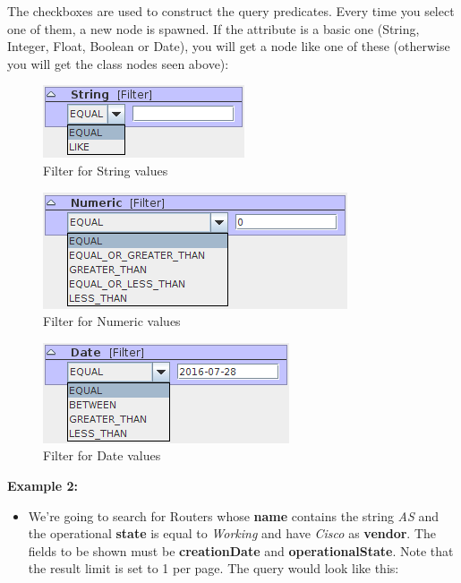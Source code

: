 \documentclass[a4paper]{article}
\begin{document}
	The checkboxes are used to construct the query predicates. Every time you select one of them, a new node is spawned. If the attribute is a basic one (String, Integer, Float, Boolean or Date), you will get a node like one of these (otherwise you will get the class nodes seen above):
	\begin{figure}[h!]
		\centering
		\includegraphics[width=0.3\linewidth]{img/query_string_filter.png}
		\caption{Filter for String values}
		\label{fig:query_string_filter}
	\end{figure}
	\newpage
	\begin{figure}[h!]
		\centering
		\includegraphics[width=0.4\linewidth]{img/query_filter_numeric.png}
		\caption{Filter for Numeric values}
		\label{fig:query_filter_numeric}
	\end{figure}
	\begin{figure}[h!]
		\centering
		\includegraphics[width=0.3\linewidth]{img/query_date_filter.png}
		\caption{Filter for Date values}
		\label{fig:query_date_filter}
	\end{figure}
	\begin{framed} {\large \textbf{Example 2:}}
		\begin{itemize}
			\item We're going to search for Routers whose \textbf{name} contains the string \textit{AS} and the operational \textbf{state} is equal to \textit{Working} and have \textit{Cisco} as \textbf{vendor}. The fields to be shown must be \textbf{creationDate} and \textbf{operationalState}. Note that the result limit is set to 1 per page.
			The query would look like this:
		\end{itemize}
	\end{framed}
\end{document}
